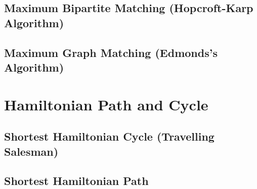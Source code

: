 \subsection{Maximum Bipartite Matching (Hopcroft-Karp Algorithm)}

\subsection{Maximum Graph Matching (Edmonds's Algorithm)}


\section{Hamiltonian Path and Cycle}
\setcounter{section}{8}
\setcounter{subsection}{0}
\subsection{Shortest Hamiltonian Cycle (Travelling Salesman)}

\subsection{Shortest Hamiltonian Path}


